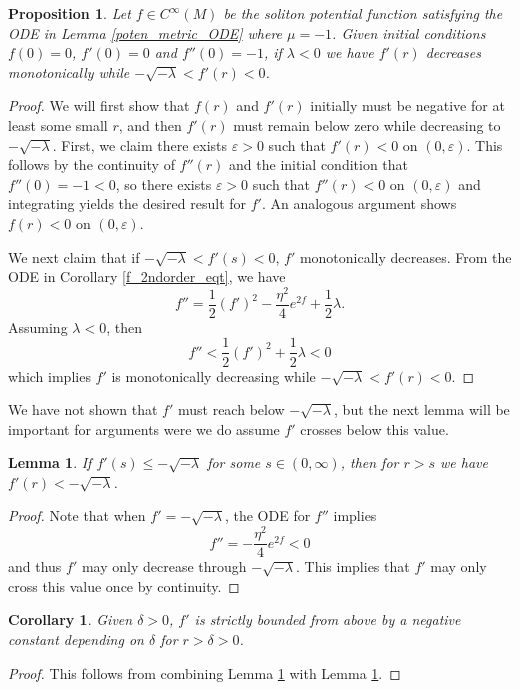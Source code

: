 \documentclass[12pt, a4paper, reqno, oneside]{amsart}
\renewcommand{\epsilon}{\varepsilon}
\numberwithin{equation}{section}
\theoremstyle{plain}
\newtheorem{lemma}[theorem]{Lemma}
\newtheorem{proposition}[theorem]{Proposition}
\newtheorem{corollary}[theorem]{Corollary}
\theoremstyle{definition}
\theoremstyle{plain}
\begin{document}
\begin{proposition}\label{existence_proof}
  Let $f\in C^{\infty}(M)$ be the soliton potential function satisfying the ODE in Lemma \ref{poten_metric_ODE} where $\mu=-1$. Given initial conditions $f(0)=0$, $f'(0)=0$ and $f''(0)=-1$, if $\lambda<0$ we have $f'(r)$ decreases monotonically while $-\sqrt{-\lambda}<f'(r)<0$.
\end{proposition}
\begin{proof}
  We will first show that $f(r)$ and $f'(r)$ initially must be negative for at least some small $r$, and then $f'(r)$ must remain below zero while decreasing to $-\sqrt{-\lambda}$. First, we claim there exists $\epsilon>0$ such that $f'(r)<0$ on $(0,\epsilon)$. This follows by the continuity of $f''(r)$ and the initial condition that $f''(0)=-1<0$, so there exists $\epsilon>0$ such that $f''(r)<0$ on $(0,\epsilon)$ and integrating yields the desired result for $f'$. An analogous argument shows $f(r)<0$ on $(0,\epsilon)$.

  We next claim that if $-\sqrt{-\lambda}<f'(s)<0$, $f'$ monotonically decreases. From the ODE in Corollary \ref{f_2ndorder_eqt}, we have
  \[
    f'' = \frac{1}{2}\left(f'\right)^2-\frac{\eta^{2}}{4}e^{2f}+\frac{1}{2}\lambda.
  \]
  Assuming $\lambda<0$, then
  \[
    f'' < \frac{1}{2}\left(f'\right)^{2}+\frac{1}{2}\lambda<0
  \]
  which implies $f'$ is monotonically decreasing while $-\sqrt{-\lambda}<f'(r)<0$.
\end{proof}

We have not shown that $f'$ must reach below $-\sqrt{-\lambda}$, but the next lemma will be important for arguments were we do assume $f'$ crosses below this value.

\begin{lemma}\label{f'_upperbnd_lemma}
  If $f'(s)\leq -\sqrt{-\lambda}$ for some $s\in(0,\infty)$, then for $r>s$ we have $f'(r)<-\sqrt{-\lambda}$.
\end{lemma}
\begin{proof}
  Note that when $f'=-\sqrt{-\lambda}$, the ODE for $f''$ implies
  \[
    f'' = -\frac{\eta^{2}}{4}e^{2f}<0
  \]
  and thus $f'$ may only decrease through $-\sqrt{-\lambda}$. This implies that $f'$ may only cross this value once by continuity. 
\end{proof}

\begin{corollary}
  Given $\delta>0$, $f'$ is strictly bounded from above by a negative constant depending on $\delta$ for $r>\delta>0$.
\end{corollary}
\begin{proof}
  This follows from combining Lemma \ref{existence_proof} with Lemma \ref{f'_upperbnd_lemma}.
\end{proof}
\end{document}
